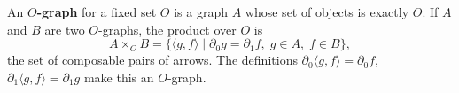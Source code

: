 An \textbf{$O$-graph} for a fixed set $O$ is a graph $A$ whose set of objects is exactly $O$. If $A$ and $B$ are two $O$-graphs, the product over $O$ is
\[
A \times_O B = \{ \langle g, f\rangle \mid \partial_0 g = \partial_1 f,\; g \in A,\; f \in B \},
\]
the set of composable pairs of arrows. The definitions $\partial_0\langle g, f\rangle = \partial_0 f$, $\partial_1\langle g, f\rangle = \partial_1 g$ make this an $O$-graph.